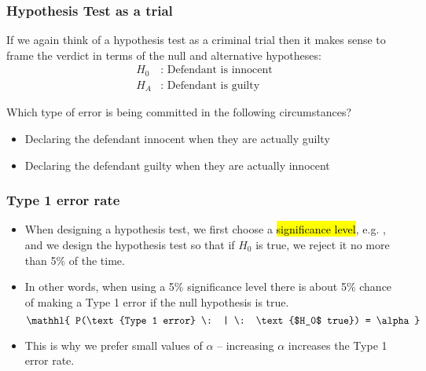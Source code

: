 \documentclass[t,compress,mathserif]{beamer}
\newcommand{\soln}[1]{\textit{#1}}
\begin{document}

\begin{frame}[shrink]
\frametitle{Hypothesis Test as a trial}

If we again think of a hypothesis test as a criminal trial then it makes sense to frame the verdict in terms of the null and alternative hypotheses:
\begin{align*}
H_0&:\text{ Defendant is innocent} \\
H_A&:\text{ Defendant is guilty}
\end{align*}

Which type of error is being committed in the following circumstances?

\begin{itemize}
\item Declaring the defendant innocent when they are actually guilty
\soln{}
\item Declaring the defendant guilty when they are actually innocent
\soln{}
\end{itemize}

\end{frame}


\begin{frame}
\frametitle{Type 1 error rate}

\begin{itemize}

\item When designing a hypothesis test, we first choose a \hl{significance level}, e.g. , and we design the hypothesis test so that if $H_0$ is true, we reject it no more than 5\% of the time.

\pause

\item In other words, when using a 5\% significance level there is about 5\% chance of making a Type 1 error if the null hypothesis is true.
\[ \mathhl{ P(\text{Type 1 error} \: | \: \text{$H_0$ true}) = \alpha } \]

\pause

\item This is why we prefer small values of $\alpha$ -- increasing $\alpha$ increases the Type 1 error rate.

\end{itemize}

\end{frame}
\end{document}
